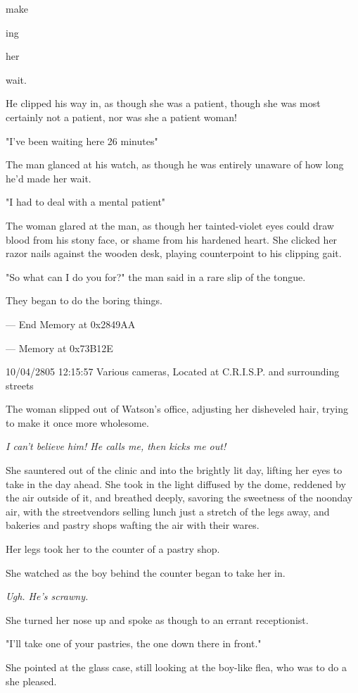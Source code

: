\documentclass[12pt]{article}
\begin{document}
make

ing

her

wait.

He clipped his way in, as though she was a patient, though she was most certainly not a patient, nor was she a patient woman!

"I've been waiting here 26 minutes"

The man glanced at his watch, as though he was entirely unaware of how long he'd made her wait.

"I had to deal with a mental patient"

The woman glared at the man, as though her tainted-violet eyes could draw blood from his stony face, or shame from his hardened heart. She clicked her razor nails against the wooden desk, playing counterpoint to his clipping gait.

"So what can I do you for?" the man said in a rare slip of the tongue.

They began to do the boring things.

--- End Memory at 0x2849AA

--- Memory at 0x73B12E

10/04/2805 12:15:57 Various cameras, Located at C.R.I.S.P. and surrounding streets

The woman slipped out of Watson's office, adjusting her disheveled hair, trying to make it once more wholesome.

\emph{I can't believe him! He calls me, then kicks me out!}

She sauntered out of the clinic and into the brightly lit day, lifting her eyes to take in the day ahead. She took in the light diffused by the dome, reddened by the air outside of it, and breathed deeply, savoring the sweetness of the noonday air, with the streetvendors selling lunch just a stretch of the legs away, and bakeries and pastry shops wafting the air with their wares.

Her legs took her to the counter of a pastry shop.

She watched as the boy behind the counter began to take her in.

\emph{Ugh. He's scrawny.}

She turned her nose up and spoke as though to an errant receptionist.

"I'll take one of your pastries, the one down there in front."

She pointed at the glass case, still looking at the boy-like flea, who was to do a she pleased.
\end{document}

